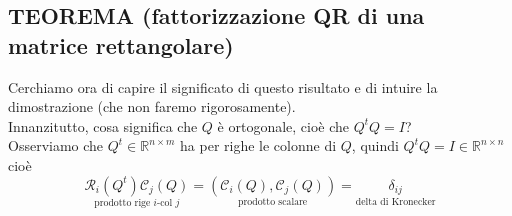 \documentclass[12pt,a4paper]{article}
\begin{document}
\subsection{TEOREMA (fattorizzazione QR di una matrice rettangolare)}
\begin{center}
\end{center}
Cerchiamo ora di capire il significato di questo risultato e di intuire la dimostrazione (che non faremo rigorosamente). \\
Innanzitutto, cosa significa che $Q$ è ortogonale, cioè che $Q^tQ=I$?\\
Osserviamo che $Q^t\in \mathbb{R}^{n\times m}$ ha per righe le colonne di $Q$, quindi $Q^tQ=I\in \mathbb{R}^{n\times n}$ cioè
\begin{equation*}
    \underset{\text{prodotto rige $i$-col $j$}}{\mathcal{R}_i(Q^t)\mathcal{C}_j(Q)}=\underset{\text{prodotto scalare}}{(\mathcal{C}_i(Q),\mathcal{C}_j(Q))}=\underset{\text{delta di Kronecker}}{\delta_{ij}}
\end{equation*}
\end{document}
